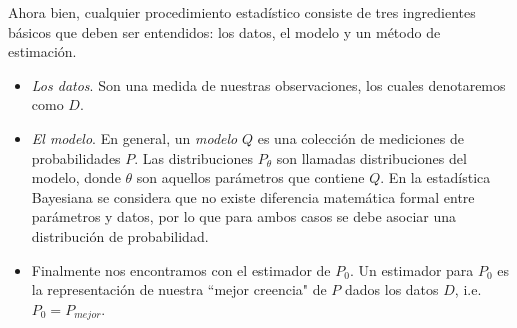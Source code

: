 \documentclass[10.5pt,prb,
               showpacs,            %
               preprintnumbers,     %
               aps,                 %
               prl,          	    %
               letterpaper,             %
               superscriptaddress,      %
               nofootinbib,         %
               tightenlines,        %
               floats,floatfix      %
               ,usenatbib]{revtex4-1}%
\begin{document}
Ahora bien, cualquier procedimiento estad\'istico  consiste de tres ingredientes b\'asicos que deben ser 
entendidos: 
los datos, el modelo y un m\'etodo de estimaci\'on.

\begin{itemize}
\item \textit{Los datos}. Son una medida de nuestras observaciones, los cuales denotaremos como $D$. 

\item \textit{El modelo}. 
En general, un \textit{modelo} $Q$ es una colecci\'on de mediciones de probabilidades $P$. 
Las distribuciones $P_\theta$ son llamadas distribuciones del modelo, donde $\theta$ son aquellos 
par\'ametros que contiene $Q$. 
En la estad\'istica Bayesiana se considera que no existe diferencia matem\'atica formal entre par\'ametros 
y datos, por lo que para ambos casos se debe asociar una distribuci\'on de probabilidad.

\item Finalmente nos encontramos con el estimador de $P_0$. Un estimador para $P_0$ es la representaci\'on 
de nuestra ``mejor creencia" de $P$ dados los datos $D$, i.e. $P_0 = P_{mejor}$. 

\end{itemize}
\end{document}
